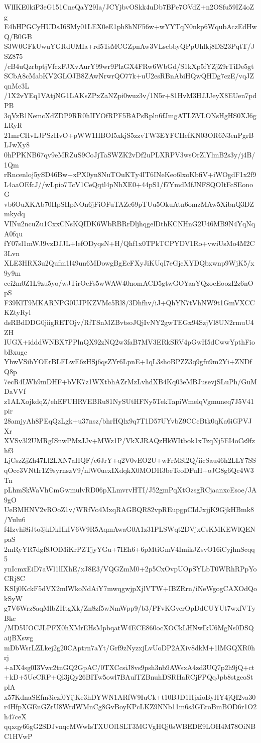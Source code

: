 WlIKE0kiP3eG151CneQaY29Ia/JCYjbvOSkk4uDb7BPe7OVdZ+n2OSfu59IZ4oZg
E4hHPGCyHUDsJ6SMy01LEX0eE1ph8hNF56w+wYYTqN0nkp6WqubAczEdHwQ/B0GB
S3W0GFkUwuYGRdUMIa+rd5TsMCGZpnAw3VLscbbyQPpUhlkj8DS23PqtT/JSZ875
/cB4uQzrbptjVfcxFJXvAurY99wr9PlzGX4FRw6WbGd/S1kXp5fYZjZ9rTiDe5gt
SCbA8cMabKV2GLOJB8ZAwNrwrQO77k+uU2esRBnAbiHQwQHDg7czE/vqJZqnMe3L
/1X2vYEq1VAtjNG1LAKsZPxZaNZpi0wuz3v/1N5r+81HvM3HJJJeyX8EUen7pdPB
3qVzB1NemcXdZDP9RR0hIIYOfRPF5BAPsRpln6fJmgATLZVLONsHgHS0XJ6gLRyR
21mrCHvLJPSzHvO+pWW1HBOI5xkjS5zzvTW3EYFCHefKN03OR6N3enPgrBLJwXy8
0hPPKNB67qv9eMRZuS9CoJjTaSWZK2vDf2uPLXRPV3wsOrZlYlmB2s3y/j4B/1Qm
rRncenloj5ySD46Bw+xPX0yn8NuTOuKTy4IT6INeKeo6lxoKbfiV+iWOgdF1x2f9
L4aaOEfcJ//wLpio7TcV1CeQqtl4pNhXE0+44pS1/f7YmdMfJNFSQOItFcSEonoG
vb6OuXKAb70HpSHpNOn6jFiOFuTAZe69pTUu5OkuAtn6omzMAw5XibnQ3DZmkydq
VINu2ncuZu1CxxCNsKQIDK6WbRBRrDljhqgelDthKCNHnG2U46MB9N4YqNqA0fqu
fY07sl1mWJ9vzDJJL+lefODyqsN+H/Qhf1x0TPkTCPYDV1Ro+vwiUsMo4M2C3Lvn
XLE3HRX3u2Qufm1l49un6MDowgBgEeFXyJiKUqI7eGjcXYDQbxwnp9WjK5/x9y9m
cei2m0Z1L9zu5yo/wJTirOcFs5wWAW40nomACD5gtwGOYaaYQzocEoozI2z6nOpS
F39KlT9MKARNPG0UJPKZVMc5Rl8/3Dhfhv/iJ+QhYN7tVhNW9t1GmVXCCKZtyRyl
dsRBdDDG0jiigRETOjv/RfTSnMZBvtsoJQjIvNY2gwTEGx94SzjVl8UN2rmuU4ZH
IUGX+idddWNBX7PPlnQX92zNQ2w3faB7MV3ERkSRV4pGwH5dCwwYpthFiobBxuge
YbwVSibYOErBLFLwE6zHSj6qsZYr6LpnE+1qL3shoBPZZ3q9gfu9m2Yi+ZNDfQ8p
7ecR4LWh9mDHF+bVK7z1WXtbhAZrMzLvhdXB4Kq03eMBJusevjSLuPh/GuMDaVVf
z1ALXojkdqZ/ehEFUHRVEBRu81NySUtHFNy5TekTapiWmelqVgmuneq7J5V41pir
28amjyAh8PEqQzLgk+u37nsz/bhrHQlx9q7T1D57UYvbZ9CCcBtk0qKa6iGPVJXr
XVSv3l2UMRgISnwPMzJJv+MWz1P/VkXJRAQzHkWItbok1xTzqNj5EI4oCs9fzhf3
LjCszZjZh47Ll2LXN7aHQF/e6JrY+q2V0vEO2U+wFrMSl2Q/iicSau46h2LLY7SS
qOcc3VNtIr1Z9syrnszV9/nlW0uexIXdqkX0MODH3beTeoDFuH+oJG8g6Qc4W3Tn
pLhmSkWaVhCmGwmulvRD06pXLmvrvHTI/J52gmPqXtOzsgRCjaanxcEsoe/JA9gO
UeBMHNV2vROoZ1v/WRfVo4MxqRAGBQR82vpREupgpCIdJxjjK9GjkHBmk8/Yulu6
f4Izvhi8iJto3jkDkHkIV6W9R5AqmAwaG0A1z31PLSWqt2DVjxCsKMKEWlQENpaS
2mRyYR7dgf8JOlMiKrPZTjyYGu+7IEh6+6pMtiGmV4ImikJZsvO16iCyjhnScqq5
ynIcmxEiD7aWl1lIXhE/xJ8E3/VQGZmM0+2p5CxOvpUOpSYLbT0WRhRPpYoCRj8C
KSIj0KckF5dVX2mlWkoNdAiY7mwqgwjpXjlVTW+IBZRrn/iNeWgogCAXOdQokSyW
g7V6Wrz8aqMlbZHtgXk/Zn8zf5wNmWpp9/b3/PFvKGverOpDdCUYUt7wxfVTyBkc
/MD5UOCJLPFX0hXMrEHsMpbqatW4ECE860ocXOCkLHNwIkU6MgNs0DSQaijBXswg
mDbWsrLZLkej2g20CAptrn7aYt/Grf9zNyzxjLvUoDP2AXiv8dkM+1lMGQXR0hrj
+aIX4sg0I3Vwc2tnGQ2GpAC/0TXCcsiJ8vs9psh3nb9AWsxA4zd3UQ7p2h9jQ+ct
+kD+5UeCRP+Ql3jQy26BITw5owl7BAulTZBnuhDSRHaRCjFPQqJpb8stgeoStplA
x57KdnaSEfm3iezf0YijKe3hDYWN1ARfW9IuCk+t10BJD1HjxioByHY4jQI2va30
r4HfpXGEnGZrU8WrdWMnCg8GvBoyKPcLKZ9NNb11m6s3GEroBmBOD6r1O2h47ceX
qqxqy66gG2SDJvnqcMWwIsTXUOl1SLT3MGVgHQj0sWBEDE9LOH4M78OiNBC1HVwP
